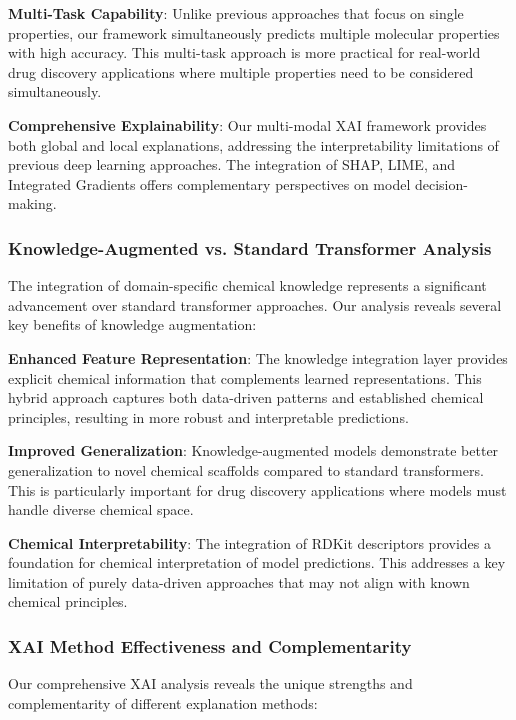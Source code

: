 \documentclass[preprint,12pt]{elsarticle}
\begin{document}
\textbf{Multi-Task Capability}: Unlike previous approaches that focus on single properties, our framework simultaneously predicts multiple molecular properties with high accuracy. This multi-task approach is more practical for real-world drug discovery applications where multiple properties need to be considered simultaneously.

\textbf{Comprehensive Explainability}: Our multi-modal XAI framework provides both global and local explanations, addressing the interpretability limitations of previous deep learning approaches. The integration of SHAP, LIME, and Integrated Gradients offers complementary perspectives on model decision-making.

\subsubsection*{Knowledge-Augmented vs. Standard Transformer Analysis}

The integration of domain-specific chemical knowledge represents a significant advancement over standard transformer approaches. Our analysis reveals several key benefits of knowledge augmentation:

\textbf{Enhanced Feature Representation}: The knowledge integration layer provides explicit chemical information that complements learned representations. This hybrid approach captures both data-driven patterns and established chemical principles, resulting in more robust and interpretable predictions.

\textbf{Improved Generalization}: Knowledge-augmented models demonstrate better generalization to novel chemical scaffolds compared to standard transformers. This is particularly important for drug discovery applications where models must handle diverse chemical space.

\textbf{Chemical Interpretability}: The integration of RDKit descriptors provides a foundation for chemical interpretation of model predictions. This addresses a key limitation of purely data-driven approaches that may not align with known chemical principles.

\subsubsection*{XAI Method Effectiveness and Complementarity}

Our comprehensive XAI analysis reveals the unique strengths and complementarity of different explanation methods:
\end{document}
